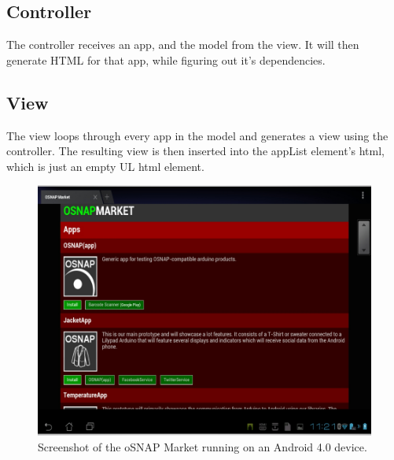 \subsection{Controller}
The controller receives an app, and the model from the view. It will then generate HTML for that app, while figuring out it's dependencies.

\subsection{View}
The view loops through every app in the model and generates a view using the controller. The resulting view is then inserted into the appList element's html, which is just an empty UL html element.

\begin{figure}
	\begin{center}
	\includegraphics[scale=0.4]{img/market-screen.png}
	\end{center}
	\caption{Screenshot of the oSNAP Market running on an Android 4.0 device.}
	\label{fig:market-screen}
\end{figure}

